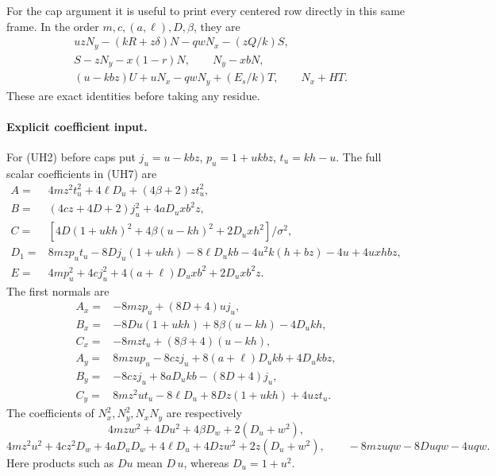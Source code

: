 For the cap argument it is useful to print every centered row directly
in this same frame. In the order $m,c,(a,\ell),D,\beta$, they are
\begin{align*}
 &uzN_y-(kR+z\delta)N-qwN_x-(zQ/k)S,\\
 &S-zN_y-x(1-r)N,\qquad N_y-xbN,\\
 &(u-kbz)U+uN_x-qwN_y+(E_s/k)T,\qquad N_x+HT.
                                                               \tag{UH20}
\end{align*}
These are exact identities before taking any residue.

\paragraph{Explicit coefficient input.}
For (UH2) before caps put $j_u=u-kbz$, $p_u=1+ukbz$,
$t_u=kh-u$. The full scalar coefficients in (UH7) are
\begin{align*}
 A={}&4mz^2t_u^2+4\ell D_u+(4\beta+2)zt_u^2,\\
 B={}&(4cz+4D+2)j_u^2+4aD_uxb^2z,\\
 C={}&[4D(1+ukh)^2+4\beta(u-kh)^2+2D_uxh^2]/\sigma^2,\\
 D_1={}&8mzp_ut_u-8Dj_u(1+ukh)-8\ell D_ukb
          -4u^2k(h+bz)-4u+4uxhbz,\\
 E={}&4mp_u^2+4cj_u^2+4(a+\ell)D_uxb^2+2D_uxb^2z.
\end{align*}
The first normals are
\begin{align*}
 A_x={}&-8mzp_u+(8D+4)uj_u,\\
 B_x={}&-8Du(1+ukh)+8\beta(u-kh)-4D_ukh,\\
 C_x={}&-8mzt_u+(8\beta+4)(u-kh),\\
 A_y={}&8mzup_u-8czj_u+8(a+\ell)D_ukb+4D_ukbz,\\
 B_y={}&-8czj_u+8aD_ukb-(8D+4)j_u,\\
 C_y={}&8mz^2ut_u-8\ell D_u+8Dz(1+ukh)+4uzt_u.
\end{align*}
The coefficients of $N_x^2,N_y^2,N_xN_y$ are respectively
\[
 4mzw^2+4Du^2+4\beta D_w+2(D_u+w^2),
\]
\[
 4mz^2u^2+4cz^2D_w+4aD_uD_w+4\ell D_u+4Dzw^2
                            +2z(D_u+w^2),
 \qquad-8mzuqw-8Duqw-4uqw.                         \tag{UH12}
\]
Here products such as $Du$ mean $D\,u$, whereas $D_u=1+u^2$.

